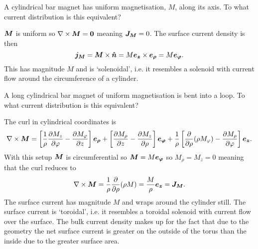     \begin{example}
        A cylindrical bar magnet has uniform magnetisation, \(M\), along its axis.
        To what current distribution is this equivalent?
        
        \(\bm{M}\) is uniform so \(\nabla\times\bm{M} = \bm{0}\) meaning \(\bm{J_M} = 0\).
        The surface current density is then
        \[\bm{j_M} = \bm{M}\times\bm{\hat{n}} = M\bm{e_{z}}\times\bm{e_{\rho}} = M\bm{e_{\varphi}}.\]
        This has magnitude \(M\) and is `solenoidal', i.e. it resembles a solenoid with current flow around the circumference of a cylinder.
    \end{example}
    \begin{example}
        A long cylindrical bar magnet of uniform magnetisation is bent into a loop.
        To what current distribution is this equivalent?
        
        The curl in cylindrical coordinates is
        \[\nabla\times\bm{M} = \left[\frac{1}{\rho}\pdv{M_z}{\varphi} - \pdv{M_\varphi}{z}\right]\bm{e_{\rho}} + \left[\pdv{M_\rho}{z} - \pdv{M_z}{\rho}\right]\bm{e_{\varphi}} + \frac{1}{\rho}\left[\pdv{\rho}(\rho M_\varphi) - \pdv{M_\rho}{\varphi}\right]\bm{e_{z}}.\]
        With this setup \(\bm{M}\) is circumferential so \(\bm{M} = M\bm{e_{\varphi}}\) so \(M_\rho = M_z = 0\) meaning that the curl reduces to
        \[\nabla\times\bm{M} = \frac{1}{\rho}\pdv{\rho}(\rho M) = \frac{M}{\rho}\bm{e_{z}} = \bm{J_M}.\]
        The surface current has magnitude \(M\) and wraps around the cylinder still.
        The surface current is `toroidal', i.e. it resembles a toroidal solenoid with current flow over the surface.
        The bulk current density makes up for the fact that due to the geometry the net surface current is greater on the outside of the torus than the inside due to the greater surface area.
    \end{example}
    
